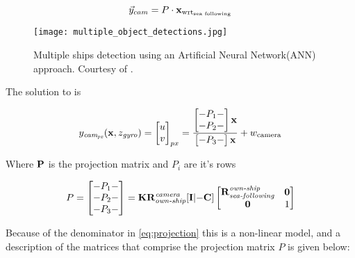 \begin{equation}\label{eq:projection_model}
\vec{{{y}}}_{cam} = P \cdot \mathbf{x}_{\text{wrt}_{\text{sea following}}}
\end{equation}


\begin{figure}
	\centering
	\texttt{[image: multiple\_object\_detections.jpg]}
	\caption{Multiple ships detection using an Artificial Neural Network(ANN) approach. Courtesy of \cite{Blanke2020}.}
	\label{fig:multipleobjectdetections}
\end{figure}



 

The solution to  is
 

\begin{equation}
{{y}}_{\textit{cam}_{\textit{px}}}(\mathbf{x},z_{\textit{gyro}}) = \begin{bmatrix}u\\v\end{bmatrix}_{px}= \frac{\begin{bmatrix}-P_1-\\-P_2-\end{bmatrix}\mathbf{x}}{
	\begin{bmatrix}
	-P_3-
	\end{bmatrix}
	\mathbf{x}}+ {w}_{\text{camera}}
\end{equation}


Where $\mathbf{P}$ is the projection matrix and $P_{i}$ are it's rows

\begin{equation} \label{eq:projection}
P = \begin{bmatrix}-P_1- \\-P_2-\\-P_3- \end{bmatrix} = \mathbf{K}\mathbf{R_{\textit{own-ship}}^{\textit{camera}}}[\mathbf{I} | \mathbf{-C}]
\begin{bmatrix}
\mathbf{\mathbf{R}_{\textit{sea-following}}^{\textit{own-ship}}} &\mathbf{0}\\
\mathbf{0} &1
\end{bmatrix}
\end{equation}

Because of the denominator in \cref{eq:projection} this is a non-linear model, and a description of the matrices that comprise the projection matrix $P$ is given below:

